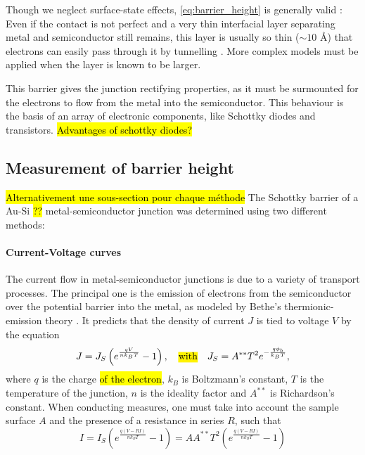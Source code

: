 Though we neglect surface-state effects, \autoref{eq:barrier_height} is generally valid \cite{sze_physics_2007}:
Even if the contact is not perfect and a very thin interfacial layer separating metal and semiconductor still remains, this layer is usually so thin ($\sim 10$ \AA) that electrons can easily pass through it by tunnelling \cite{rhoderick_physics_1970}.
More complex models must be applied when the layer is known to be larger.

This barrier gives the junction rectifying properties, as it must be surmounted for the electrons to flow from the metal into the semiconductor.
This behaviour is the basis of an array of electronic components, like Schottky diodes and transistors.
\hl{Advantages of schottky diodes?}

\subsection{Measurement of barrier height}
\hl{Alternativement une sous-section pour chaque méthode}
The Schottky barrier of a Au-Si \hl{??} metal-semiconductor junction was determined using two different methods:

\paragraph{Current-Voltage curves}
The current flow in metal-semiconductor junctions is due to a variety of transport processes.
The principal one is the emission of electrons from the semiconductor over the potential barrier into the metal, as modeled by Bethe's thermionic-emission theory \cite{sze_physics_2007}.
It predicts that the density of current $J$ is tied to voltage $V$ by the equation
\begin{equation} \label{eq:thermionic_emission_current}
    J = J_S \left( e^{\frac{qV}{n k_B T}} - 1 \right), \quad \text{\hl{with}} \quad J_S = A^{**} T^2 e^{-\frac{q \phi_b}{k_B T}},
\end{equation}
where $q$ is the charge \hl{of the electron}, $k_B$ is Boltzmann's constant, $T$ is the temperature of the junction, $n$ is the ideality factor and $A^{**}$ is Richardson's constant.
When conducting measures, one must take into account the sample surface $A$ and the presence of a resistance in series $R$, such that
\begin{equation}
    I = I_S \left( e^{\frac{q (V- RI)}{n k_B T}} - 1\right) = A A^{**} T^2 \left( e^{\frac{q (V- RI)}{n k_B T}} - 1\right)
\end{equation}

